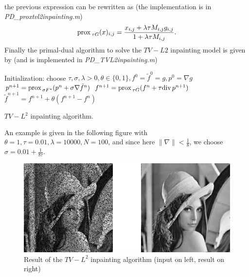\documentclass[letter,10pt]{article}
\def\Div{\textup{div\,}}
\def\prox{\textup{prox\,}}
\begin{document}
the previous expression can be rewritten as (the implementation is in \textit{PD\_proxtvl2inpainting.m})
$$\prox_{\tau G}(x)_{i,j}=\frac{x_{i,j}+\lambda\tau M_{i,j}g_{i,j}}{1+\lambda\tau M_{i,j}}.$$
Finally the primal-dual algorithm to solve the $TV-L2$ inpainting model is given by (and is implemented in \textit{PD\_TVL2inpainting.m})
\begin{algorithm}[H]
\begin{algorithmic}
\STATE Initialization: choose $\tau,\sigma,\lambda>0,\theta\in\{0,1\},f^0=\tilde{f}^0=g,p^0=\nabla g$
\REPEAT 
\STATE $p^{n+1}=\prox_{\sigma F^*}(p^n+\sigma \nabla\tilde{f}^n)$
\STATE $f^{n+1}=\prox_{\tau G}(f^n+\tau \Div p^{n+1})$
\STATE $\tilde{f}^{n+1}=f^{n+1}+\theta(f^{n+1}-f^n)$
\end{algorithmic}
\caption{$TV-L^2$ inpainting algorithm.}
\end{algorithm}
An example is given in the following figure with $\theta=1,\tau=0.01,\lambda=10000,N=100$, and since here $\|\nabla\|<\frac{1}{8}$, we choose $\sigma=0.01+\frac{1}{8\tau}$.
\begin{figure}[H]
\centering\includegraphics[width=\textwidth]{tvl2inpainting.png}
\caption{Result of the $TV-L^2$ inpainting algorithm (input on left, result on right)}
\end{figure}
\end{document}
